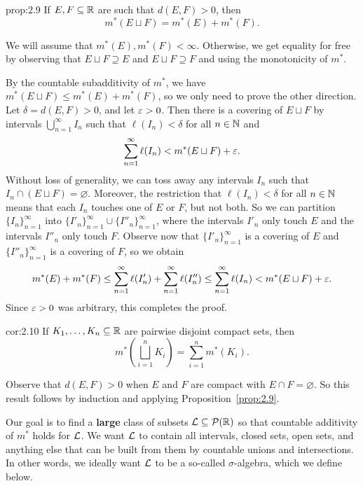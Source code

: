 \begin{prop}{prop:2.9}
    If $E, F \subseteq \mathbb{R}$ are such that $d(E, F) > 0$, then 
    \[ m^*(E \sqcup F) = m^*(E) + m^*(F). \] 
\end{prop}
\begin{pf}
    We will assume that $m^*(E), m^*(F) < \infty$. Otherwise, we get equality 
    for free by observing that $E \sqcup F \supseteq E$ and $E \sqcup F 
    \supseteq F$ and using the monotonicity of $m^*$. 
    
    By the countable subadditivity of $m^*$, we have $m^*(E \sqcup F) \leq 
    m^*(E) + m^*(F)$, so we only need to prove the other direction. 
    Let $\delta = d(E, F) > 0$, and let $\varepsilon > 0$. Then there is a 
    covering of $E \sqcup F$ by intervals $\bigcup_{n=1}^\infty I_n$ 
    such that $\ell(I_n) < \delta$ for all $n \in \mathbb{N}$ and 
    \[ \sum_{n=1}^\infty \ell(I_n) < m^*(E \sqcup F) + \varepsilon. \] 
    Without loss of generality, we can toss away any intervals $I_n$ 
    such that $I_n \cap (E \sqcup F) = \varnothing$. Moreover, the 
    restriction that $\ell(I_n) < \delta$ for all $n \in \mathbb{N}$ means that 
    each $I_n$ touches one of $E$ or $F$, but not both. So we can 
    partition $\{I_n\}_{n=1}^\infty$ into $\{I'_n\}_{n=1}^\infty 
    \cup \{I''_n\}_{n=1}^\infty$, where the intervals $I'_n$ only touch 
    $E$ and the intervals $I''_n$ only touch $F$. Observe now that 
    $\{I'_n\}_{n=1}^\infty$ is a covering of $E$ and 
    $\{I''_n\}_{n=1}^\infty$ is a covering of $F$, so we obtain 
    \[ m^*(E) + m^*(F) \leq \sum_{n=1}^\infty \ell(I'_n) + \sum_{n=1}^\infty 
    \ell(I''_n) \leq \sum_{n=1}^\infty \ell(I_n) < m^*(E \sqcup F) + \varepsilon. \] 
    Since $\varepsilon > 0$ was arbitrary, this completes the proof. 
\end{pf}

\begin{cor}{cor:2.10}
    If $K_1, \dots, K_n \subseteq \mathbb{R}$ are pairwise disjoint compact sets, then 
    \[ m^*\!\left( \bigsqcup_{i=1}^n K_i \right) = \sum_{i=1}^n m^*(K_i). \] 
\end{cor}
\begin{pf}
    Observe that $d(E, F) > 0$ when $E$ and $F$ are compact with $E \cap F 
    = \varnothing$. So this result follows by induction and applying 
    Proposition~\ref{prop:2.9}. 
\end{pf}

Our goal is to find a {\bf large} class of subsets ${\cal L} \subseteq 
{\cal P}(\mathbb{R})$ so that countable additivity of $m^*$ holds for ${\cal L}$. 
We want ${\cal L}$ to contain all intervals, closed sets, open sets, and 
anything else that can be built from them by countable unions and intersections. 
In other words, we ideally want ${\cal L}$ to be a so-called $\sigma$-algebra, 
which we define below.

